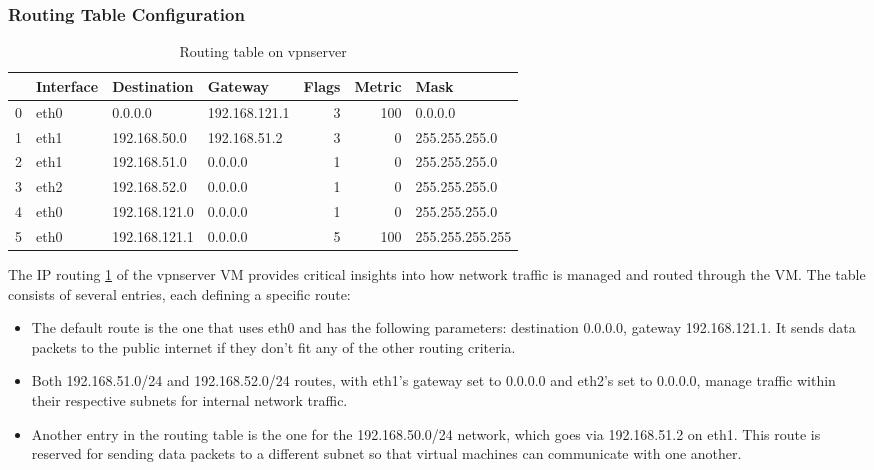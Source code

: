 \documentclass[12pt, fleqn, a4paper]{article}
\begin{document}
\subsubsection{Routing Table Configuration}
\begin{table}[H]
	\caption{Routing table on vpnserver}
	\centering
\begin{tabular}{llllrrl}
\toprule
{} & Interface &    Destination &        Gateway &  Flags &  Metric &             Mask \\
\midrule
0 &      eth0 &        0.0.0.0 &  192.168.121.1 &      3 &     100 &          0.0.0.0 \\
1 &      eth1 &   192.168.50.0 &   192.168.51.2 &      3 &       0 &    255.255.255.0 \\
2 &      eth1 &   192.168.51.0 &        0.0.0.0 &      1 &       0 &    255.255.255.0 \\
3 &      eth2 &   192.168.52.0 &        0.0.0.0 &      1 &       0 &    255.255.255.0 \\
4 &      eth0 &  192.168.121.0 &        0.0.0.0 &      1 &       0 &    255.255.255.0 \\
5 &      eth0 &  192.168.121.1 &        0.0.0.0 &      5 &     100 &  255.255.255.255 \\
\bottomrule
\end{tabular}
  \label{tab:vpnserver2}
\end{table}
The IP routing \cref{tab:vpnserver2} of the vpnserver VM provides critical insights into how network traffic is managed and routed through the VM. The table consists of several entries, each defining a specific route:
\begin{itemize}
\item The default route is the one that uses eth0 and has the following parameters: destination 0.0.0.0, gateway 192.168.121.1. It sends data packets to the public internet if they don't fit any of the other routing criteria.
\item Both 192.168.51.0/24 and 192.168.52.0/24 routes, with eth1's gateway set to 0.0.0.0 and eth2's set to 0.0.0.0, manage traffic within their respective subnets for internal network traffic. 
\item Another entry in the routing table is the one for the 192.168.50.0/24 network, which goes via 192.168.51.2 on eth1. This route is reserved for sending data packets to a different subnet so that virtual machines can communicate with one another.
\end{itemize}
\end{document}
